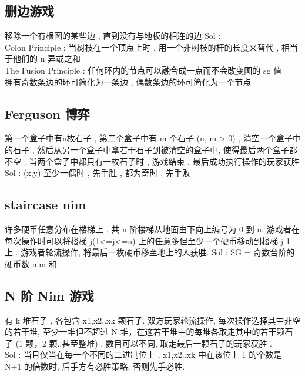 \subsection{删边游戏}
移除一个有根图的某些边 , 直到没有与地板的相连的边
Sol : \\
Colon Principle : 
当树枝在一个顶点上时 , 用一个非树枝的杆的长度来替代 , 相当于他们的 n 异或之和 \\
The Fusion Principle : 任何环内的节点可以融合成一点而不会改变图的 sg 值 \\
拥有奇数条边的环可简化为一条边 , 偶数条边的环可简化为一个节点
\subsection{Ferguson 博弈}
第一个盒子中有n枚石子 , 
第二个盒子中有 m 个石子 (n, m > 0) , 
清空一个盒子中的石子 , 
然后从另一个盒子中拿若干石子到被清空的盒子中, 
使得最后两个盒子都不空 . 
当两个盒子中都只有一枚石子时 , 游戏结束 . 最后成功执行操作的玩家获胜 \\

Sol : (x,y) 至少一偶时 , 先手胜 , 都为奇时 , 先手败
\subsection{staircase nim}
许多硬币任意分布在楼梯上 ,  
共 n 阶楼梯从地面由下向上编号为 0 到 n.
游戏者在每次操作时可以将楼梯 j(1<=j<=n) 上的任意多但至少一个硬币移动到楼梯 j-1 上 .
游戏者轮流操作, 将最后一枚硬币移至地上的人获胜.
Sol : SG = 奇数台阶的硬币数 nim 和

\subsection{N 阶 Nim 游戏}
有 k 堆石子 , 
各包含 x1,x2..xk 颗石子. 
双方玩家轮流操作, 每次操作选择其中非空的若干堆, 
至少一堆但不超过 N 堆，在这若干堆中的每堆各取走其中的若干颗石子 (1 颗，2 颗..甚至整堆)
, 数目可以不同, 取走最后一颗石子的玩家获胜 . \\

Sol : 当且仅当在每一个不同的二进制位上
, x1,x2..xk 中在该位上 1 的个数是 N+1 的倍数时, 后手方有必胜策略, 否则先手必胜.
